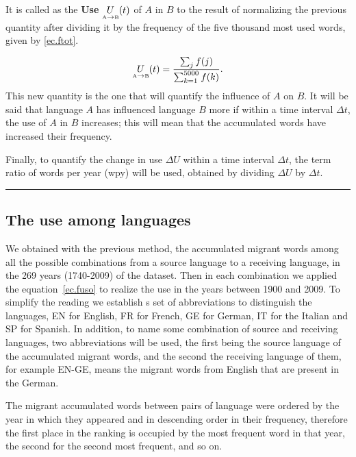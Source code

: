 \documentclass[10pt,letterpaper]{article} %
\begin{document}
	It is called as the \textbf{Use} $\underset{ \text{\tiny A} \to \text{\tiny B} }{U}(t)$ of $A$ in $B$ to the result of normalizing the previous quantity after dividing it by the frequency of the five thousand most used words, given by \ref{ec.ftot}.
	
	\begin{equation}
	\label{ec.fuso1}
	\underset{ \text{\tiny A} \to  \text{\tiny B} }{U}(t) = \frac{\sum_{j} f(j)}{\sum_{k=1}^{5000} f(k)}.
	\end{equation}
	This new quantity is the one that will quantify the influence of $A$ on $B$. It will be said that language $A$ has influenced language $B$ more if within a time interval $\Delta t$, the use of $A$ in $B$ increases; this will mean that the accumulated words have increased their frequency.
	
	Finally, to quantify the change in use  $\Delta U$ within a time interval $\Delta t$, the term ratio of words per year (wpy) will be used, obtained by dividing $\Delta U$ by $\Delta t$.
	\noindent\rule{10cm}{0.4pt}
	
	
	\subsection*{The use among languages} %
	
	We obtained with the previous method, the accumulated migrant words among all the possible combinations from a source language to a receiving language, in the 269 years (1740-2009) of the dataset. Then in each combination we applied the equation~\ref{ec.fuso} to realize the use in the years between 1900 and 2009. To simplify the reading we establish s set of abbreviations to distinguish the languages, EN for English, FR for French, GE for German, IT for the Italian and SP for Spanish. In addition, to name some combination of source  and receiving languages, two abbreviations will be used, the first being the source language of the accumulated migrant words, and the second the receiving language of them, for example EN-GE, means the migrant words from English that are present in the German.
	
	The migrant accumulated words between pairs of language were ordered by the year in which they appeared and in descending order in their frequency, therefore the first place in the ranking is occupied by the most frequent word in that year, the second for the second most frequent, and so on.
	
\end{document}
